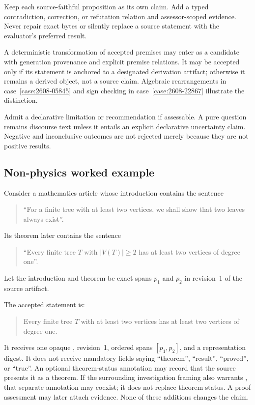 \begin{description}[style=nextline]
  \item[Contradictions and corrections.] Keep each source-faithful proposition as its own claim. Add a typed contradiction, correction, or refutation relation and assessor-scoped evidence. Never repair exact bytes or silently replace a source statement with the evaluator's preferred result.

  \item[System-derived claims.] A deterministic transformation of accepted premises may enter as a candidate with generation provenance and explicit premise relations. It may be accepted only if its statement is anchored to a designated derivation artifact; otherwise it remains a derived object, not a source claim. Algebraic rearrangements in case~\ref{case:2608-05845} and sign checking in case~\ref{case:2608-22867} illustrate the distinction.

  \item[Limitations, questions, and recommendations.] Admit a declarative limitation or recommendation if assessable. A pure question remains discourse text unless it entails an explicit declarative uncertainty claim. Negative and inconclusive outcomes are not rejected merely because they are not positive results.
\end{description}

\subsection{Non-physics worked example}

Consider a mathematics article whose introduction contains the sentence
\begin{quote}
``For a finite tree with at least two vertices, we shall show that two leaves always exist''.
\end{quote}
Its theorem later contains the sentence
\begin{quote}
``Every finite tree $T$ with $|V(T)|\geq2$ has at least two vertices of degree one''.
\end{quote}
Let the introduction and theorem be exact spans $p_1$ and $p_2$ in revision~1 of the source artifact.

The accepted statement is:
\begin{quote}
Every finite tree $T$ with at least two vertices has at least two vertices of degree one.
\end{quote}
It receives one opaque , revision~1, ordered spans $[p_1,p_2]$, and a representation digest. It does not receive mandatory fields saying ``theorem'', ``result'', ``proved'', or ``true''. An optional theorem-status annotation may record that the source presents it as a theorem. If the surrounding investigation framing also warrants , that separate annotation may coexist; it does not replace theorem status. A proof assessment may later attach evidence. None of these additions changes the claim.

